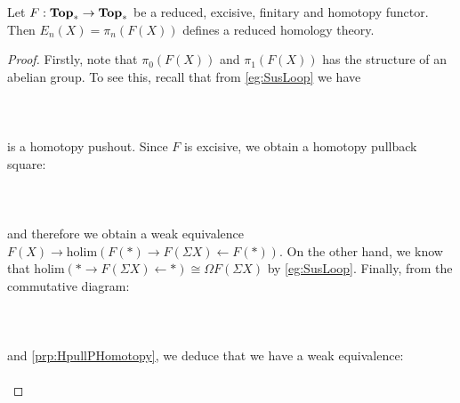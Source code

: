 \begin{thm}\label{thm:HomotopyGrpExHomology} Let $F:\bold{Top}_\ast\to\bold{Top}_\ast$ be a reduced, excisive, finitary and homotopy functor. Then $E_n(X)=\pi_n(F(X))$ defines a reduced homology theory. 
\begin{proof}
Firstly, note that $\pi_0(F(X))$ and $\pi_1(F(X))$ has the structure of an abelian group. To see this, recall that from \ref{eg:SusLoop} we have  
 \\~\\  \\~\\
is a homotopy pushout. Since $F$ is excisive, we obtain a homotopy pullback square:  
 \\~\\  \\~\\
and therefore we obtain a weak equivalence $F(X)\to\text{holim}(F(\ast)\rightarrow F(\Sigma X)\leftarrow F(\ast))$. On the other hand, we know that $\text{holim}(\ast\rightarrow F(\Sigma X)\leftarrow\ast)\cong\Omega F(\Sigma X)$ by \ref{eg:SusLoop}. Finally, from the commutative diagram:  
 \\~\\  \\~\\
and \ref{prp:HpullPHomotopy}, we deduce that we have a weak equivalence:  
 \\~\\ 
\end{proof}
\end{thm}
